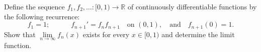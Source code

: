 Define the sequence \(f_1,f_2,\ldots \colon [0,1)\to \mathbb{R}\) of continuously differentiable functions by the following recurrence: \[ f_1=1; \qquad \quad f_{n+1}'=f_nf_{n+1} \quad\text{on \((0,1)\)}, \quad \text{and}\quad f_{n+1}(0)=1. \]
Show that \(\lim\limits_{n\to \infty}f_n(x)\) exists for every \(x\in [0,1)\) and determine the limit function.